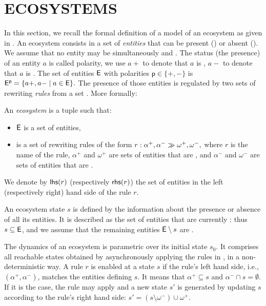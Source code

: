\documentclass[a4paper,twoside]{article}
\begin{document}
\section{\uppercase{Ecosystems}}
\label{sec:ecosystems}
In this section, we recall the formal definition of a model of an ecosystem as given in \cite{pommereau-gaucherel2017,gaucherel2012,gaucherel2014,gaucherel2017}. %
An ecosystem consists in a set of \emph{entities} \E that can be present (\On) or absent (\Off). We assume that no entity may be simultaneously \On and \Off. The status (the presence) of an entity $a$ is called polarity, we use $a+$ to denote that $a$ is \On, $a-$ to denote that $a$ is \Off. The set of entities $\mathsf{E}$ with polarities $\mathsf{p} \in \{+,-\}$ is $\mathsf{E^p}= \{a+, a- \mid a \in \mathsf{E}\}.$ 
The presence of those entities is regulated by two sets of rewriting \emph{rules} from a set \Ru.
More formally:

\begin{definition}[Ecosystem]
An \emph{ecosystem} \RR is a tuple \rsys{\E}{\Ru} such that:
\begin{itemize}
\item $\mathsf{E}$ is a set of entities, 
\item \Ru is a set of rewriting rules of the form
$ r: \alpha^+,\alpha^- \gg \omega^+,\omega^-, $
where 
$r$ is the name of the rule, 
$\alpha^+$ and $\omega^+$ are sets of entities that are \On, and 
$\alpha^-$ and $\omega^-$ are sets of entities that are \Off.
\end{itemize}
\end{definition}

We denote by $\mathsf{lhs}(r)$ (respectively $\mathsf{rhs}(r)$) the set of entities in the left (respectively right) hand side of the rule $r$. 

An ecosystem state $s$ is defined by the information 
about the presence or absence of all its entities. It is described as the set of entities that are currently \On: thus 
$s \subseteq  \mathsf{E}$, and we assume  that the remaining entities $\mathsf{E} \setminus s$ are \Off.

The dynamics of an ecosystem \rsys{\E}{\Ru} is parametric over its initial state $s_0$.  
It comprises all reachable states obtained by asynchronously applying the rules in {\Ru}, in a non-deterministic way.
A rule $r$ is enabled at a state $s$ if the rule's left hand side, i.e., $(\alpha^+, \alpha^-)$,
matches the entities defining $s$. 
It means that $\alpha^+\subseteq s$ and $\alpha^- \cap s=\emptyset$.
If it is the case, the rule may apply and 
a new state $s'$ is generated by updating $s$ according to the rule's right hand side: $s'=(s\setminus \omega^-)\cup \omega^+. $
 
\end{document}
